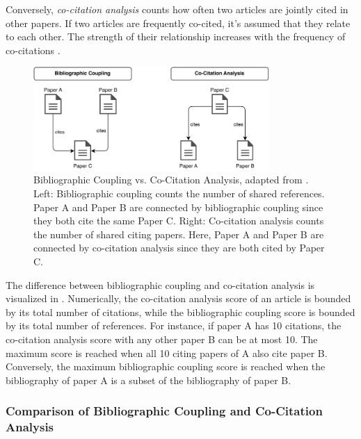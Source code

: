 Conversely, \emph{co-citation analysis} counts how often two articles are jointly cited in other papers. If two articles are frequently co-cited, it's assumed that they relate to each other. The strength of their relationship increases with the frequency of co-citations \cite{SmallCocitationScientific1973,GippCitationProximity2009}.

\begin{figure}[ht]
    \centering
    \includegraphics[width=0.8\textwidth]{diagrams/bibliographic_coupling_co_citation.pdf}
    \caption[Bibliographic Coupling vs. Co-Citation Analysis]{Bibliographic Coupling vs. Co-Citation Analysis, adapted from \cite{GippCitationProximity2009}.
        Left: Bibliographic coupling counts the number of shared references. Paper A and Paper B are connected by bibliographic coupling since they both cite the same Paper C. Right: Co-citation analysis counts the number of shared citing papers. Here, Paper A and Paper B are connected by co-citation analysis since they are both cited by Paper C.}
    \label{fig:bibliographic_coupling_co_citation}
\end{figure}

The difference between bibliographic coupling and co-citation analysis is visualized in .
Numerically, the co-citation analysis score of an article is bounded by its total number of citations, while the bibliographic coupling score is bounded by its total number of references.
For instance, if paper A has 10 citations, the co-citation analysis score with any other paper B can be at most 10.
The maximum score is reached when all 10 citing papers of A also cite paper B.
Conversely, the maximum bibliographic coupling score is reached when the bibliography of paper A is a subset of the bibliography of paper B.


\subsubsection*{Comparison of Bibliographic Coupling and Co-Citation Analysis} \label{sec:comparison-of-bibliographic-coupling-and-co-citation-analysis}

